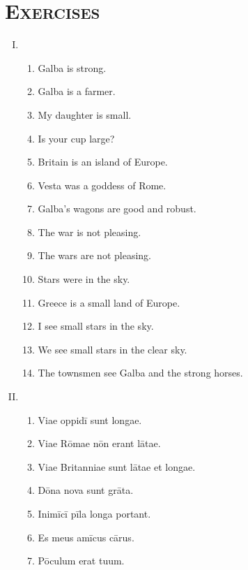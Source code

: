 \documentclass[12pt]{article}
\begin{document}
\section{\textsc{Exercises}}
\begin{enumerate}[I.]
	\setlength{\itemsep}{1em}
	\item \begin{enumerate}[1)]
		\item Galba is strong.
		\item Galba is a farmer.
		\item My daughter is small.
		\item Is your cup large?
		\item Britain is an island of Europe.
		\item Vesta was a goddess of Rome.
		\item Galba's wagons are good and robust.
		\item The war is not pleasing.
		\item The wars are not pleasing.
		\item Stars were in the sky.
		\item Greece is a small land of Europe.
		\item I see small stars in the sky.
		\item We see small stars in the clear sky.
		\item The townsmen see Galba and the strong horses.
	\end{enumerate}
	\item \begin{enumerate}[1)]
		\item Viae oppidī sunt longae.
		\item Viae Rōmae nōn erant lātae.
		\item Viae Britanniae sunt lātae et longae.
		\item Dōna nova sunt grāta.
		\item Inimīcī pīla longa portant.
		\item Es meus amīcus cārus.
		\item Pōculum erat tuum.
	\end{enumerate}
\end{enumerate}
\end{document}
